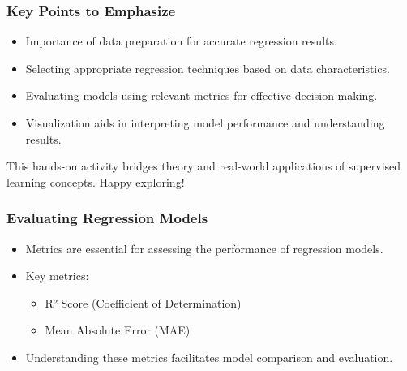 \documentclass[aspectratio=169]{beamer}
\begin{document}
\begin{frame}[fragile]
    \frametitle{Key Points to Emphasize}
    
    \begin{itemize}
        \item Importance of data preparation for accurate regression results.
        \item Selecting appropriate regression techniques based on data characteristics.
        \item Evaluating models using relevant metrics for effective decision-making.
        \item Visualization aids in interpreting model performance and understanding results.
    \end{itemize}
    
    This hands-on activity bridges theory and real-world applications of supervised learning concepts. Happy exploring!
\end{frame}

\begin{frame}[fragile]
    \frametitle{Evaluating Regression Models}
    \begin{itemize}
        \item Metrics are essential for assessing the performance of regression models.
        \item Key metrics: 
        \begin{itemize}
            \item R² Score (Coefficient of Determination)
            \item Mean Absolute Error (MAE)
        \end{itemize}
        \item Understanding these metrics facilitates model comparison and evaluation.
    \end{itemize}
\end{frame}
\end{document}
